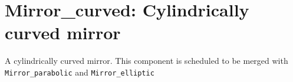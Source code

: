 \section{Mirror\_curved: Cylindrically curved mirror}


A cylindrically curved mirror.
This component is scheduled to be merged with \texttt{Mirror\_parabolic} and \texttt{Mirror\_elliptic} 
